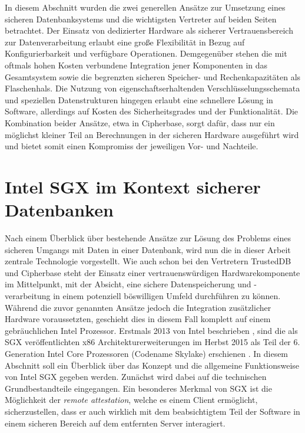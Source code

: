 In diesem Abschnitt wurden die zwei generellen Ansätze zur Umsetzung eines sicheren Datenbanksystems und die wichtigsten Vertreter auf beiden Seiten betrachtet. Der Einsatz von dedizierter Hardware als sicherer Vertrauensbereich zur Datenverarbeitung erlaubt eine große Flexibilität in Bezug auf Konfigurierbarkeit und verfügbare Operationen. Demgegenüber stehen die mit oftmals hohen Kosten verbundene Integration jener Komponenten in das Gesamtsystem sowie die begrenzten sicheren Speicher- und Rechenkapazitäten als Flaschenhals. Die Nutzung von eigenschaftserhaltenden Verschlüsselungsschemata und speziellen Datenstrukturen hingegen erlaubt eine schnellere Lösung in Software, allerdings auf Kosten des Sicherheitsgrades und der Funktionalität. Die Kombination beider Ansätze, etwa in Cipherbase, sorgt dafür, dass nur ein möglichst kleiner Teil an Berechnungen in der sicheren Hardware ausgeführt wird und bietet somit einen Kompromiss der jeweiligen Vor- und Nachteile.

\section{Intel SGX im Kontext sicherer Datenbanken}

Nach einem Überblick über bestehende Ansätze zur Lösung des Problems eines sicheren Umgangs mit Daten in einer Datenbank, wird nun die in dieser Arbeit zentrale Technologie vorgestellt. Wie auch schon bei den Vertretern TrustedDB und Cipherbase steht der Einsatz einer vertrauenswürdigen Hardwarekomponente im Mittelpunkt, mit der Absicht, eine sichere Datenspeicherung und -verarbeitung in einem potenziell böswilligen Umfeld durchführen zu können. Während die zuvor genannten Ansätze jedoch die Integration zusätzlicher Hardware voraussetzten, geschieht dies in diesem Fall komplett auf einem gebräuchlichen Intel Prozessor. Erstmals 2013 von Intel beschrieben \cite{McKeen2013}, sind die als \ac{SGX} veröffentlichten x86 Architekturerweiterungen im Herbst 2015 als Teil der 6. Generation Intel Core Prozessoren (Codename Skylake) erschienen \cite{Aumasson2016}. In diesem Abschnitt soll ein Überblick über das Konzept und die allgemeine Funktionsweise von Intel \ac{SGX} gegeben werden. Zunächst wird dabei auf die technischen Grundbestandteile eingegangen. Ein besonderes Merkmal von \ac{SGX} ist die Möglichkeit der \textit{remote attestation}, welche es einem Client ermöglicht, sicherzustellen, dass er auch wirklich mit dem beabsichtigtem Teil der Software in einem sicheren Bereich auf dem entfernten Server interagiert.

